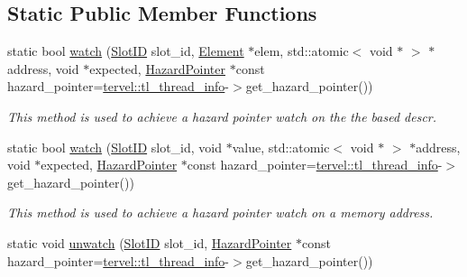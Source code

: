 \subsection*{Static Public Member Functions}
\begin{DoxyCompactItemize}
\item 
static bool \hyperlink{classtervel_1_1util_1_1memory_1_1hp_1_1_hazard_pointer_a120e2c2ab55e065af1a94323436e194c}{watch} (\hyperlink{classtervel_1_1util_1_1memory_1_1hp_1_1_hazard_pointer_a390f6869150121a40b300b955198b897}{Slot\+I\+D} slot\+\_\+id, \hyperlink{classtervel_1_1util_1_1memory_1_1hp_1_1_element}{Element} $\ast$elem, std\+::atomic$<$ void $\ast$ $>$ $\ast$address, void $\ast$expected, \hyperlink{classtervel_1_1util_1_1memory_1_1hp_1_1_hazard_pointer}{Hazard\+Pointer} $\ast$const hazard\+\_\+pointer=\hyperlink{namespacetervel_a60b23602adbb2dee6160af411b74bfd3}{tervel\+::tl\+\_\+thread\+\_\+info}-\/$>$get\+\_\+hazard\+\_\+pointer())
\begin{DoxyCompactList}\small\item\em This method is used to achieve a hazard pointer watch on the the based descr. \end{DoxyCompactList}\item 
static bool \hyperlink{classtervel_1_1util_1_1memory_1_1hp_1_1_hazard_pointer_a922cce0c823718c742dbe175302746e7}{watch} (\hyperlink{classtervel_1_1util_1_1memory_1_1hp_1_1_hazard_pointer_a390f6869150121a40b300b955198b897}{Slot\+I\+D} slot\+\_\+id, void $\ast$value, std\+::atomic$<$ void $\ast$ $>$ $\ast$address, void $\ast$expected, \hyperlink{classtervel_1_1util_1_1memory_1_1hp_1_1_hazard_pointer}{Hazard\+Pointer} $\ast$const hazard\+\_\+pointer=\hyperlink{namespacetervel_a60b23602adbb2dee6160af411b74bfd3}{tervel\+::tl\+\_\+thread\+\_\+info}-\/$>$get\+\_\+hazard\+\_\+pointer())
\begin{DoxyCompactList}\small\item\em This method is used to achieve a hazard pointer watch on a memory address. \end{DoxyCompactList}\item 
static void \hyperlink{classtervel_1_1util_1_1memory_1_1hp_1_1_hazard_pointer_a1590c02f081e2f007ccd094316d1c63c}{unwatch} (\hyperlink{classtervel_1_1util_1_1memory_1_1hp_1_1_hazard_pointer_a390f6869150121a40b300b955198b897}{Slot\+I\+D} slot\+\_\+id, \hyperlink{classtervel_1_1util_1_1memory_1_1hp_1_1_hazard_pointer}{Hazard\+Pointer} $\ast$const hazard\+\_\+pointer=\hyperlink{namespacetervel_a60b23602adbb2dee6160af411b74bfd3}{tervel\+::tl\+\_\+thread\+\_\+info}-\/$>$get\+\_\+hazard\+\_\+pointer())

\end{DoxyCompactItemize}
